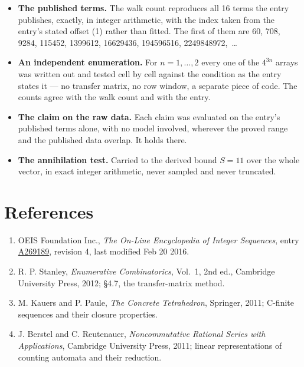 \documentclass[11pt]{article}
\theoremstyle{definition}
\begin{document}
\begin{itemize}

\item {\bfseries The published terms.} The walk count reproduces all 16 terms the entry publishes, exactly, in integer arithmetic, with the index taken from the entry's stated offset (1) rather than fitted. The first of them are 60, 708, 9284, 115452, 1399612, 16629436, 194596516, 2249848972,~\dots

\item {\bfseries An independent enumeration.} For $n = 1,\dots,2$ every one of the $4^{3n}$ arrays was written out and tested cell by cell against the condition as the entry states it --- no transfer matrix, no row window, a separate piece of code. The counts agree with the walk count and with the entry.

\item {\bfseries The claim on the raw data.} Each claim was evaluated on the entry's published terms alone, with no model involved, wherever the proved range and the published data overlap. It holds there.

\item {\bfseries The annihilation test.} Carried to the derived bound $S = 11$ over the whole vector, in exact integer arithmetic, never sampled and never truncated.

\end{itemize}

\section{References}

\begin{enumerate}

\item OEIS Foundation Inc., \emph{The On-Line Encyclopedia of Integer Sequences}, entry \href{https://oeis.org/A269189}{A269189}, revision 4, last modified Feb 20 2016.

\item R. P. Stanley, \emph{Enumerative Combinatorics}, Vol.~1, 2nd ed., Cambridge University Press, 2012; \S4.7, the transfer-matrix method.

\item M. Kauers and P. Paule, \emph{The Concrete Tetrahedron}, Springer, 2011; C-finite sequences and their closure properties.

\item J. Berstel and C. Reutenauer, \emph{Noncommutative Rational Series with Applications}, Cambridge University Press, 2011; linear representations of counting automata and their reduction.

\end{enumerate}
\end{document}
